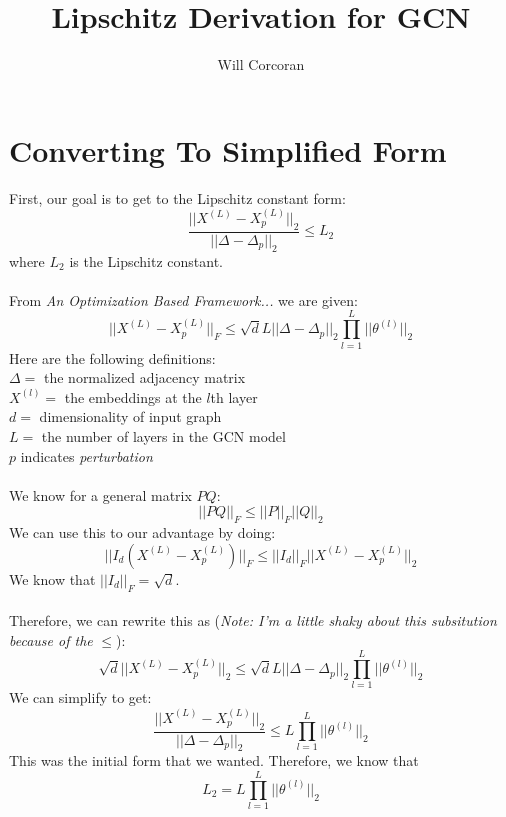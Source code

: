 \documentclass[10pt]{article}         %
\title{Lipschitz Derivation for GCN}
\author{Will Corcoran}
\begin{document}
\maketitle

\section{Converting To Simplified Form}
First, our goal is to get to the Lipschitz constant form:
$$
\frac{||X^{(L)} - X^{(L)}_p||_2}{||\Delta - \Delta_p||_2} \leq L_2
$$
where $L_2$ is the Lipschitz constant. 
\\\\
From \textit{An Optimization Based Framework...} we are given:
$$
||X^{(L)} - X^{(L)}_p||_F \leq \sqrt{d} L ||\Delta - \Delta_p||_2 \prod_{l=1}^{L} ||\theta^{(l)}||_2
$$
Here are the following definitions:
\\$\Delta = $ the normalized adjacency matrix
\\$X^{(l)} = $ the embeddings at the $l$th layer
\\$d = $ dimensionality of input graph
\\$L = $ the number of layers in the GCN model
\\$p$ indicates \textit{perturbation}
\\\\
We know for a general matrix $PQ$:
$$
||PQ||_F \leq ||P||_F ||Q||_2
$$
We can use this to our advantage by doing:
$$
||I_d (X^{(L)} - X^{(L)}_p)||_F \leq ||I_d||_F ||X^{(L)} - X^{(L)}_p||_2
$$
We know that $||I_d||_F = \sqrt{d}$.
\\\\
Therefore, we can rewrite this as (\emph{Note: I'm a little shaky about this subsitution because of the} $\leq$):
$$
\sqrt{d}||X^{(L)} - X^{(L)}_p||_2 \leq \sqrt{d} L ||\Delta - \Delta_p||_2 \prod_{l=1}^{L} ||\theta^{(l)}||_2
$$
We can simplify to get:
$$
\frac{||X^{(L)} - X^{(L)}_p||_2}{||\Delta - \Delta_p||_2} \leq L \prod_{l=1}^{L} ||\theta^{(l)}||_2
$$
This was the initial form that we wanted. 
Therefore, we know that
$$
L_2 = L \prod_{l=1}^{L} ||\theta^{(l)}||_2
$$
\end{document}
